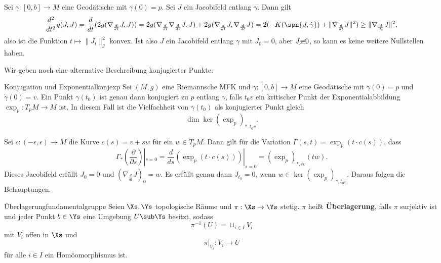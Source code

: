 \begin{beweis}
Sei $\gamma: [0,b] \to M$ eine Geodätische mit $\gamma(0)=p$. Sei $J$ ein Jacobifeld entlang $\gamma$. Dann gilt
\begin{equation}
\frac{d^2}{dt^2} g(J,J) = \frac{d}{dt} (2g(\nabla_\frac{d}{dt}J,J)) = 2g(\nabla_\frac{d}{dt} \nabla_\frac{d}{dt} J,J) + 2g (\nabla_\frac{d}{dt} J, \nabla_\frac{d}{dt} J) = 2(-K (\spn \{ J, \dot{\gamma}\}) + \| \nabla_\frac{d}{dt} J \|^2) \geq \| \nabla_\frac{d}{dt} J \|^2,
\end{equation}
also ist die Funktion $t \mapsto \| J_t \|^2_g$ konvex. Ist also $J$ ein Jacobifeld entlang $\gamma$ mit $J_0 = 0$, aber $J \cancel{\equiv} 0$, so kann es keine weitere Nullstellen haben.
\end{beweis}
Wir geben noch eine alternative Beschreibung konjugierter Punkte:
\begin{lemma}{Konjugation und Exponential}{konjexp}
Sei $(M, g)$ eine Riemannsche MFK und $\gamma: [0,b] \to M$ eine Geodätische mit $\gamma(0) = p$ und $\dot{\gamma}(0)=v$. Ein Punkt $\gamma(t_0)$ ist genau dann konjugiert zu $p$ entlang $\gamma$, falls $t_0v$ ein kritischer Punkt der Exponentialabbildung $\exp_p: T_pM \to M$ ist. In diesem Fall ist die Vielfachheit von $\gamma(t_0)$ als konjugierter Punkt gleich 
\begin{equation}
\dim \ker (\exp_p)_{\ast, t_0v}.
\end{equation}
\end{lemma}
\begin{beweis}
Sei $c: (- \epsilon, \epsilon) \to M$ die Kurve $c(s)=v+sw$ für ein $w \in T_pM$. Dann gilt für die Variation $\Gamma(s,t)=\exp_p(t\cdot c(s))$, dass
\begin{equation}
\Gamma_\ast(\frac{\partial}{\partial s})|_{s=0} = \frac{d}{ds}(\exp_p(t \cdot c(s)))|_{s=0} = (\exp_p)_{\ast, tv} (tw).
\end{equation}
Dieses Jacobifeld erfüllt $J_0=0$ und $(\nabla_\frac{d}{dt} J)_0=w$. Es erfüllt genau dann $J_{t_0}=0$, wenn $w \in \ker(\exp_p)_{\ast, t_0v}$. Daraus folgen die Behauptungen.
\end{beweis}
\begin{definition}{Überlagerung}{fundamentalgruppe}
Seien $\Xs, \Ys$ topologische Räume und $\pi: \Xs \to \Ys$ stetig. $\pi$ heißt \textbf{Überlagerung}, falls $\pi$ surjektiv ist und jeder Punkt $b \in \Ys$ eine Umgebung $U \sub \Ys$ besitzt, sodass 
\begin{equation}
\pi^{-1}(U) = \sqcup_{i \in I} V_i
\end{equation}
mit $V_i$ offen in $\Xs$ und
\begin{equation}
\pi|_{V_i}:V_i \to U
\end{equation}
für alle $i \in I$ ein Homöomorphismus ist.
\end{definition}
